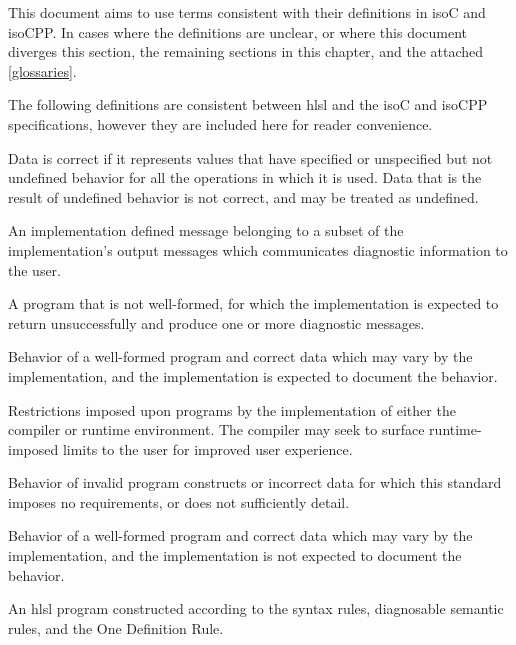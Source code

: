 
\p This document aims to use terms consistent with their definitions in
\gls{isoC} and \gls{isoCPP}. In cases where the definitions are unclear, or
where this document diverges this section, the remaining sections in this
chapter, and the attached \ref{glossaries}.


\p The following definitions are consistent between \acrshort{hlsl} and the
\gls{isoC} and \gls{isoCPP} specifications, however they are included here for
reader convenience.

\p Data is correct if it represents values that have specified or unspecified
but not undefined behavior for all the operations in which it is used. Data that
is the result of undefined behavior is not correct, and may be treated as
undefined.

\p An implementation defined message belonging to a subset of the
implementation's output messages which communicates diagnostic information to
the user.

\p A program that is not well-formed, for which the implementation is expected
to return unsuccessfully and produce one or more diagnostic messages.

\p Behavior of a well-formed program and correct data which may vary by the
implementation, and the implementation is expected to document the behavior.

\p Restrictions imposed upon programs by the implementation of either the
compiler or runtime environment. The compiler may seek to surface
runtime-imposed limits to the user for improved user experience.

\p Behavior of invalid program constructs or incorrect data for which this
standard imposes no requirements, or does not sufficiently detail.

\p Behavior of a well-formed program and correct data which may vary by the
implementation, and the implementation is not expected to document the behavior.

\p An \acrshort{hlsl} program constructed according to the syntax rules,
diagnosable semantic rules, and the One Definition Rule.

